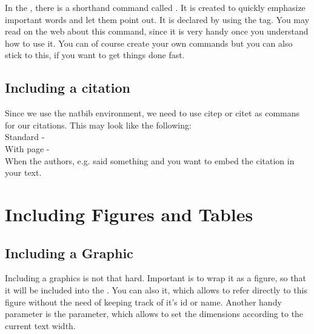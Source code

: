 In the , there is a shorthand command called . It is created to quickly emphasize important words and let them point out. It is declared by using the  tag. You may read on the web about this command, since it is very handy once you understand how to use it. You can of course create your own commands but you can also stick to this, if you want to get things done fast.


\subsection{Including a citation}

Since we use the natbib environment, we need to use citep or citet as commans for our citations. This may look like the following:\\

Standard -  \citep{SkieThea2008} \citep{lombard} \citep{bendavid}\\

With page - \citep[p.123]{BernAnal2010}\\

When the authors, e.g. \citet{mayring2014} said something and you want to embed the citation in your text.

%
%
\newpage
\section{Including Figures and Tables}


\subsection{Including a Graphic}

Including a graphics is not that hard. Important is to wrap it as a figure, so that it will be included into the . You can also  it, which allows to refer directly to this figure without the need of keeping track of it's id or name. Another handy parameter is the  parameter, which allows to set the dimensions according to the current text width.

